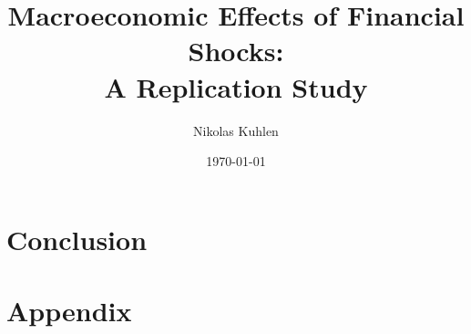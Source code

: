 \documentclass[12pt,a4paper,leqno]{article}
\begin{document}
\title{Macroeconomic Effects of Financial Shocks: \\A Replication Study
}

\author{Nikolas Kuhlen
}

\date{\today}

\maketitle
\thispagestyle{empty}


\clearpage

\newpage
\setcounter{page}{2}
\newpage
\tableofcontents%
\newpage
\listoffigures
\listoftables


\newpage
{}%
\setcounter{page}{1}






\section{Conclusion}
\label{sec:conclusion}

\newpage
\vfill
{}




\newpage
\appendix
\section*{Appendix}
\renewcommand{\thesubsection}{\Alph{subsection}}

\renewcommand{\thetable}{\Alph{subsection}\arabic{table}}
\renewcommand{\thefigure}{\Alph{subsection}\arabic{figure}}


\end{document}
